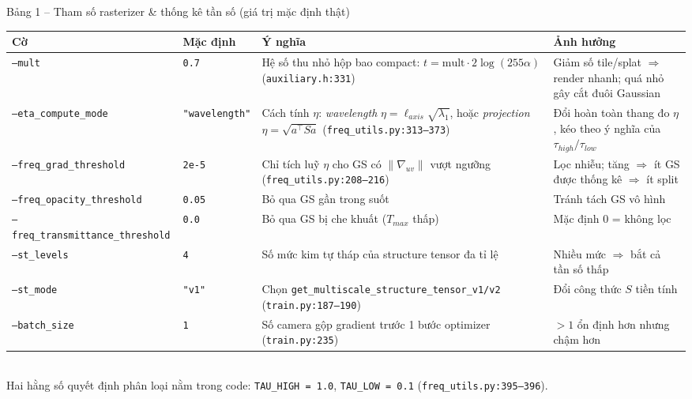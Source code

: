 \begin{frame}{Bảng 1 -- Tham số rasterizer \& thống kê tần số (giá trị mặc định thật)}
\scriptsize
\centering
\begin{tabular}{llp{4.6cm}p{3.3cm}}
\toprule
\textbf{Cờ} & \textbf{Mặc định} & \textbf{Ý nghĩa} & \textbf{Ảnh hưởng} \\
\midrule
\texttt{--mult} & \texttt{0.7} & Hệ số thu nhỏ hộp bao compact: $t=\text{mult}\cdot 2\log(255\alpha)$ (\texttt{auxiliary.h:331}) & Giảm số tile/splat $\Rightarrow$ render nhanh; quá nhỏ gây cắt đuôi Gaussian \\
\texttt{--eta\_compute\_mode} & \texttt{"wavelength"} & Cách tính $\eta$: \textit{wavelength} $\eta=\ell_{axis}\sqrt{\lambda_1}$, hoặc \textit{projection} $\eta=\sqrt{a^{\!\top}\!Sa}$ (\texttt{freq\_utils.py:313--373}) & Đổi hoàn toàn thang đo $\eta$, kéo theo ý nghĩa của $\tau_{high}/\tau_{low}$ \\
\texttt{--freq\_grad\_threshold} & \texttt{2e-5} & Chỉ tích luỹ $\eta$ cho GS có $\lVert\nabla_{uv}\rVert$ vượt ngưỡng (\texttt{freq\_utils.py:208--216}) & Lọc nhiễu; tăng $\Rightarrow$ ít GS được thống kê $\Rightarrow$ ít split \\
\texttt{--freq\_opacity\_threshold} & \texttt{0.05} & Bỏ qua GS gần trong suốt & Tránh tách GS vô hình \\
\texttt{--freq\_transmittance\_threshold} & \texttt{0.0} & Bỏ qua GS bị che khuất ($T_{max}$ thấp) & Mặc định $0$ = không lọc \\
\texttt{--st\_levels} & \texttt{4} & Số mức kim tự tháp của structure tensor đa tỉ lệ & Nhiều mức $\Rightarrow$ bắt cả tần số thấp \\
\texttt{--st\_mode} & \texttt{"v1"} & Chọn \texttt{get\_multiscale\_structure\_tensor\_v1/v2} (\texttt{train.py:187--190}) & Đổi công thức $S$ tiền tính \\
\texttt{--batch\_size} & \texttt{1} & Số camera gộp gradient trước 1 bước optimizer (\texttt{train.py:235}) & $>1$ ổn định hơn nhưng chậm hơn \\
\bottomrule
\end{tabular}
\vspace{0.1cm}\\
\scriptsize Hai hằng số quyết định phân loại nằm trong code: \texttt{TAU\_HIGH = 1.0}, \texttt{TAU\_LOW = 0.1} (\texttt{freq\_utils.py:395--396}).
\end{frame}

